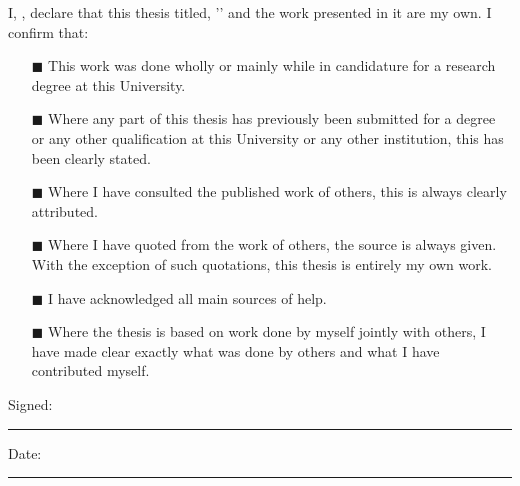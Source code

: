 I, \authornames, declare that this thesis titled, '\ttitle' and the
work presented in it are my own. I confirm that:

\begin{itemize}

\item[\tiny{$\blacksquare$}]
This work was done wholly or mainly while in candidature for a
research degree at this University.

\item[\tiny{$\blacksquare$}]
Where any part of this thesis has previously been submitted for a
degree or any other qualification at this University or any other
institution, this has been clearly stated.

\item[\tiny{$\blacksquare$}]
Where I have consulted the published work of others, this is always
clearly attributed.

\item[\tiny{$\blacksquare$}]
Where I have quoted from the work of others, the source is always
given. With the exception of such quotations, this thesis is entirely
my own work.

\item[\tiny{$\blacksquare$}]
I have acknowledged all main sources of help.

\item[\tiny{$\blacksquare$}]
Where the thesis is based on work done by myself jointly with others,
I have made clear exactly what was done by others and what I have
contributed myself.

\end{itemize}

Signed:\\
\rule[1em]{25em}{0.5pt} %

Date:\\
\rule[1em]{25em}{0.5pt} %

